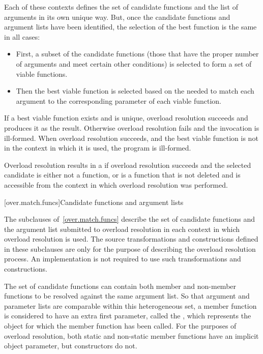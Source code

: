 Each of these contexts defines the set of candidate functions and
the list of arguments in its own unique way.
But, once the
candidate functions and argument lists have been identified, the
selection of the best function is the same in all cases:

\begin{itemize}
\item
First, a subset of the candidate functions (those that have
the proper number of arguments and meet certain other
conditions) is selected to form a set of
%
viable functions.
\item
Then the best viable function is selected based on the
 needed to
match each argument to the corresponding parameter of each
viable function.
\end{itemize}

\pnum
If a best viable function exists and is unique, overload
resolution succeeds and produces it as the result.
Otherwise
overload resolution fails and the invocation is ill-formed.
When overload resolution succeeds,
and the best viable function is not  in the context
in which it is used,
the program is ill-formed.

\pnum
Overload resolution results in a 
if overload resolution succeeds and
the selected candidate
is either not a function, or
is a function that is not deleted and
is accessible from the context
in which overload resolution was performed.

[over.match.funcs]{Candidate functions and argument lists}%
%

\pnum
The subclauses of~\ref{over.match.funcs} describe
the set of candidate functions and the argument list submitted to
overload resolution in each context in which
overload resolution is used.
The source transformations and constructions defined
in these subclauses are only for the purpose of describing the
overload resolution process.
An implementation is not required
to use such transformations and constructions.

\pnum
{}%
%
The set of candidate functions can contain both member and non-member
functions to be resolved against the same argument list.
So that argument and parameter lists are comparable within this
heterogeneous set, a member function is considered to have an
extra first parameter, called the
,
which represents the object for which the member function has been
called.
For the purposes of overload resolution, both static and
non-static member functions have an implicit object parameter,
but constructors do not.

